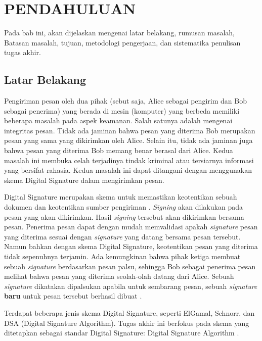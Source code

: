 \vspace{0ex}
\chapter {PENDAHULUAN}

Pada bab ini, akan dijelaskan mengenai latar belakang, rumusan masalah, Batasan masalah, tujuan, metodologi pengerjaan, dan sistematika penulisan tugas akhir.

\section{Latar Belakang}

\par Pengiriman pesan oleh dua pihak (sebut saja, Alice sebagai pengirim dan Bob sebagai penerima) yang berada di mesin (komputer) yang berbeda memiliki beberapa masalah pada aspek keamanan. Salah satunya adalah mengenai integritas pesan. Tidak ada jaminan bahwa pesan yang diterima Bob merupakan pesan yang sama yang dikirimkan oleh Alice. Selain itu, tidak ada jaminan juga bahwa pesan yang diterima Bob memang benar berasal dari Alice. Kedua masalah ini membuka celah terjadinya tindak kriminal atau tersiarnya informasi yang bersifat rahasia. Kedua masalah ini dapat ditangani dengan menggunakan skema Digital Signature dalam mengirimkan pesan. \cite{stallings_cryptography}

Digital Signature merupakan skema untuk memastikan keotentikan sebuah dokumen dan keotentikan sumber pengiriman \cite{stallings_cryptography}. \textit{Signing} akan dilakukan pada pesan yang akan dikirimkan. Hasil \textit{signing} tersebut akan dikirimkan bersama pesan. Penerima pesan dapat dengan mudah memvalidasi apakah \textit{signature} pesan yang diterima sesuai dengan \textit{signature} yang datang bersama pesan tersebut. Namun bahkan dengan skema Digital Signature, keotentikan pesan yang diterima tidak sepenuhnya terjamin. Ada kemungkinan bahwa pihak ketiga membuat sebuah \textit{signature} berdasarkan pesan palsu, sehingga Bob sebagai penerima pesan melihat bahwa pesan yang diterima seolah-olah datang dari Alice. Sebuah \textit{signature} dikatakan dipalsukan apabila untuk sembarang pesan, sebuah \textit{signature} \textbf{baru} untuk pesan tersebut berhasil dibuat \cite{goldwasser_adaptive_chosen_message}.

Terdapat beberapa jenis skema Digital Signature, seperti ElGamal, Schnorr, dan DSA (Digital Signature Algorithm). Tugas akhir ini berfokus pada skema yang ditetapkan sebagai standar Digital Signature: Digital Signature Algorithm \cite{stallings_cryptography}.

